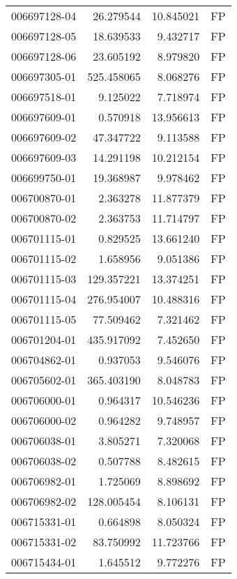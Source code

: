 \begin{tabular}{lrrl}
006697128-04 &   26.279544 &      10.845021 &   FP \\
006697128-05 &   18.639533 &       9.432717 &   FP \\
006697128-06 &   23.605192 &       8.979820 &   FP \\
006697305-01 &  525.458065 &       8.068276 &   FP \\
006697518-01 &    9.125022 &       7.718974 &   FP \\
006697609-01 &    0.570918 &      13.956613 &   FP \\
006697609-02 &   47.347722 &       9.113588 &   FP \\
006697609-03 &   14.291198 &      10.212154 &   FP \\
006699750-01 &   19.368987 &       9.978462 &   FP \\
006700870-01 &    2.363278 &      11.877379 &   FP \\
006700870-02 &    2.363753 &      11.714797 &   FP \\
006701115-01 &    0.829525 &      13.661240 &   FP \\
006701115-02 &    1.658956 &       9.051386 &   FP \\
006701115-03 &  129.357221 &      13.374251 &   FP \\
006701115-04 &  276.954007 &      10.488316 &   FP \\
006701115-05 &   77.509462 &       7.321462 &   FP \\
006701204-01 &  435.917092 &       7.452650 &   FP \\
006704862-01 &    0.937053 &       9.546076 &   FP \\
006705602-01 &  365.403190 &       8.048783 &   FP \\
006706000-01 &    0.964317 &      10.546236 &   FP \\
006706000-02 &    0.964282 &       9.748957 &   FP \\
006706038-01 &    3.805271 &       7.320068 &   FP \\
006706038-02 &    0.507788 &       8.482615 &   FP \\
006706982-01 &    1.725069 &       8.898692 &   FP \\
006706982-02 &  128.005454 &       8.106131 &   FP \\
006715331-01 &    0.664898 &       8.050324 &   FP \\
006715331-02 &   83.750992 &      11.723766 &   FP \\
006715434-01 &    1.645512 &       9.772276 &   FP \\

\end{tabular}

